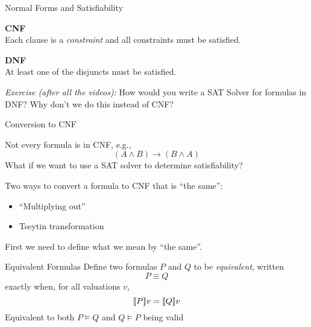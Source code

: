 \documentclass[xetex,aspectratio=169,14pt,hyperref={pdfpagelabels=true,pdflang={en-GB}}]{beamer}
\begin{document}
\begin{frame}
  {Normal Forms and Satisfiability}

  \textbf{CNF} \\ Each clause is a \emph{constraint} and all constraints
  must be satisfied.

  \bigskip

  \textbf{DNF} \\ At least one of the disjuncts must be satisfied.

  \bigskip

  \emph{Exercise (after all the videos):} How would you write a SAT
  Solver for formulas in DNF? Why don't we do this instead of CNF?
\end{frame}

\begin{frame}
  {Conversion to CNF}

  Not every formula is in CNF, e.g.,
  \begin{displaymath}
    (A \land B) \to (B \land A)
  \end{displaymath}
  What if we want to use a SAT solver to determine satisfiability?

  \bigskip

  Two ways to convert a formula to CNF that is ``the same'':
  \begin{itemize}
  \item ``Multiplying out''
  \item Tseytin transformation
  \end{itemize}

  \bigskip

  First we need to define what we mean by ``the same''.

\end{frame}

\begin{frame}
  {Equivalent Formulas}
  Define two formulas $P$ and $Q$ to be \emph{equivalent}, written
  \begin{displaymath}
    P \equiv Q
  \end{displaymath}
  exactly when, for all valuations $v$,
  \begin{displaymath}
    \llbracket P \rrbracket v = \llbracket Q \rrbracket v
  \end{displaymath}
  \textcolor{black!60}{Equivalent to both $P \models Q$ and $Q \models P$ being valid}
\end{frame}
\end{document}
